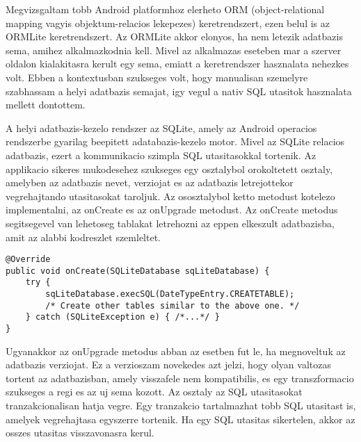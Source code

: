 Megvizsgaltam tobb Android platformhoz elerheto ORM (object-relational mapping vagyis objektum-relacios lekepezes) keretrendszert, ezen belul is az ORMLite keretrendszert. 
Az ORMLite akkor elonyos, ha nem letezik adatbazis sema, amihez alkalmazkodnia kell.
Mivel az alkalmazas eseteben mar a szerver oldalon kialakitasra kerult egy sema, emiatt a keretrendszer hasznalata nehezkes volt.
Ebben a kontextusban szukseges volt, hogy manualisan szemelyre szabhassam a helyi adatbazis semajat, igy vegul a nativ SQL utasitok hasznalata mellett dontottem.

A helyi adatbazis-kezelo rendszer az SQLite, amely az Android operacios rendszerbe gyarilag beepitett adatabazis-kezelo motor.
Mivel az SQLite relacios adatbazis, ezert a kommunikacio szimpla SQL utasitasokkal tortenik.
Az applikacio sikeres mukodesehez szukseges egy  osztalybol orokoltetett osztaly, amelyben az adatbazis nevet, verziojat es az adatbazis letrejottekor vegrehajtando utasitasokat taroljuk.
Az ososztalybol ketto metodust kotelezo implementalni, az onCreate es az onUpgrade metodust.
Az onCreate metodus segitsegevel van lehetoseg tablakat letrehozni az eppen elkeszult adatbazisba, amit az alabbi kodreszlet szemleltet.
\begin{lstlisting}
@Override
public void onCreate(SQLiteDatabase sqLiteDatabase) {
	try {
		sqLiteDatabase.execSQL(DateTypeEntry.CREATETABLE);
		/* Create other tables similar to the above one. */
	} catch (SQLiteException e) { /*...*/ }
}
\end{lstlisting}
Ugyanakkor az onUpgrade metodus abban az esetben fut le, ha megnoveltuk az adatbazis verziojat.
Ez a verzioszam novekedes azt jelzi, hogy olyan valtozas tortent az adatbazisban, amely visszafele nem kompatibilis, es egy transzformacio szukseges a regi es az uj sema kozott.
Az  osztaly az SQL utasitasokat tranzakcionalisan hatja vegre.
Egy tranzakcio tartalmazhat tobb SQL utasitast is, amelyek vegrehajtasa egyszerre tortenik.
Ha egy SQL utasitas sikertelen, akkor az osszes utasitas visszavonasra kerul.

